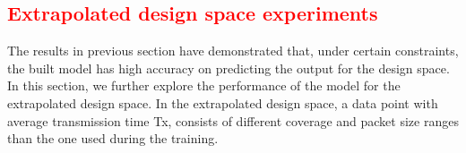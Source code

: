 
\subsection{\textcolor{red}{Extrapolated design space experiments}}


 
 The results in previous section have demonstrated that, under certain constraints, the built model has high accuracy on predicting the output for the design space. In this section, we further explore the performance of the model for the extrapolated design space. In the extrapolated design space, 
 a data point with average transmission time Tx, consists of different coverage and packet size ranges than the one used during the training.
 
